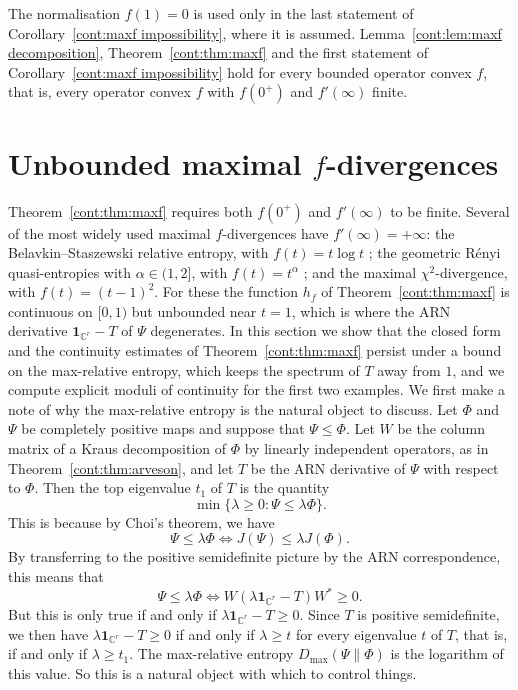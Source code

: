 \begin{remark}\label{cont:rem:normalisation}
The normalisation $f(1)=0$ is used only in the last statement of Corollary~\ref{cont:maxf impossibility}, where it is assumed. Lemma~\ref{cont:lem:maxf decomposition}, Theorem~\ref{cont:thm:maxf} and the first statement of Corollary~\ref{cont:maxf impossibility} hold for every bounded operator convex $f$, that is, every operator convex $f$ with $f(0^+)$ and $f'(\infty)$ finite.
\end{remark}

\section{Unbounded maximal \texorpdfstring{$f$}{f}-divergences}\label{cont:sec:unbounded}

Theorem~\ref{cont:thm:maxf} requires both $f(0^+)$ and $f'(\infty)$ to be finite. Several of the most widely used maximal $f$-divergences have $f'(\infty)=+\infty$: the Belavkin--Staszewski relative entropy, with $f(t)=t\log t$ \cite{BelavkinStaszewski1982}; the geometric R\'enyi quasi-entropies with $\alpha\in(1,2]$, with $f(t)=t^\alpha$ \cite{KatariyaWilde2021,FangFawzi2021}; and the maximal $\chi^2$-divergence, with $f(t)=(t-1)^2$. For these the function $h_f$ of Theorem~\ref{cont:thm:maxf} is continuous on $[0,1)$ but unbounded near $t=1$, which is where the ARN derivative $\mathbf{1}_{\mathbb{C}^r}-T$ of $\Psi$ degenerates. In this section we show that the closed form and the continuity estimates of Theorem~\ref{cont:thm:maxf} persist under a bound on the max-relative entropy, which keeps the spectrum of $T$ away from $1$, and we compute explicit moduli of continuity for the first two examples. We first make a note of why the max-relative entropy is the natural object to discuss. Let $\Phi$ and $\Psi$ be completely positive maps and suppose that $\Psi\leq \Phi$. Let $W$ be the column matrix of a Kraus decomposition of $\Phi$ by linearly independent operators, as in Theorem~\ref{cont:thm:arveson}, and let $T$ be the ARN derivative of $\Psi$ with respect to $\Phi$. Then the top eigenvalue $t_1$ of $T$ is the quantity \[\min\{\lambda\geq 0:\Psi\leq \lambda \Phi\}.\] This is because by Choi's theorem, we have 
\[
    \Psi\leq \lambda\Phi\iff J(\Psi)\leq \lambda J(\Phi).
\]
By transferring to the positive semidefinite picture by the ARN correspondence, this means that 
\[
    \Psi\leq\lambda\Phi \iff W(\lambda \mathbf{1}_{\mathbb{C}^r}-T)W^*\geq 0.
\]
But this is only true if and only if $\lambda \mathbf{1}_{\mathbb{C}^r}-T\geq 0$. Since $T$ is positive semidefinite, we then have $\lambda\mathbf{1}_{\mathbb{C}^r}-T\geq 0$ if and only if $\lambda\geq t$ for every eigenvalue $t$ of $T$, that is, if and only if $\lambda \geq t_1$. The max-relative entropy $D_{\max}(\Psi\|\Phi)$ is the logarithm of this value. So this is a natural object with which to control things.


